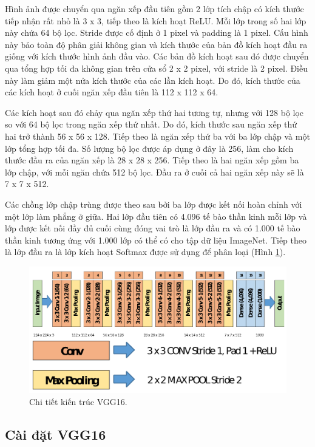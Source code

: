 Hình ảnh được chuyển qua ngăn xếp đầu tiên gồm 2 lớp tích chập có kích thước tiếp nhận rất nhỏ là 3 x 3, tiếp theo là kích hoạt ReLU. Mỗi lớp trong số hai lớp này chứa 64 bộ lọc. Stride được cố định ở 1 pixel và padding là 1 pixel. Cấu hình này bảo toàn độ phân giải không gian và kích thước của bản đồ kích hoạt đầu ra giống với kích thước hình ảnh đầu vào. Các bản đồ kích hoạt sau đó được chuyển qua tổng hợp tối đa không gian trên cửa sổ 2 x 2 pixel, với stride là 2 pixel. Điều này làm giảm một nửa kích thước của các lần kích hoạt. Do đó, kích thước của các kích hoạt ở cuối ngăn xếp đầu tiên là 112 x 112 x 64.

Các kích hoạt sau đó chảy qua ngăn xếp thứ hai tương tự, nhưng với 128 bộ lọc so với 64 bộ lọc trong ngăn xếp thứ nhất. Do đó, kích thước sau ngăn xếp thứ hai trở thành 56 x 56 x 128. Tiếp theo là ngăn xếp thứ ba với ba lớp chập và một lớp tổng hợp tối đa. Số lượng bộ lọc được áp dụng ở đây là 256, làm cho kích thước đầu ra của ngăn xếp là 28 x 28 x 256. Tiếp theo là hai ngăn xếp gồm ba lớp chập, với mỗi ngăn chứa 512 bộ lọc. Đầu ra ở cuối cả hai ngăn xếp này sẽ là 7 x 7 x 512.

Các chồng lớp chập trùng được theo sau bởi ba lớp được kết nối hoàn chỉnh với một lớp làm phẳng ở giữa. Hai lớp đầu tiên có 4.096 tế bào thần kinh mỗi lớp và lớp được kết nối đầy đủ cuối cùng đóng vai trò là lớp đầu ra và có 1.000 tế bào thần kinh tương ứng với 1.000 lớp có thể có cho tập dữ liệu ImageNet. Tiếp theo là lớp đầu ra là lớp kích hoạt Softmax được sử dụng để phân loại (Hình \ref{fig:vgg16_imagenet_detail}).

\begin{figure}[H]
	\centering
	\includegraphics[width=1\linewidth]{images/vgg16_imagenet_detail}
	\caption{Chi tiết kiến trúc VGG16.}
	\label{fig:vgg16_imagenet_detail}
\end{figure}

\subsection{Cài đặt VGG16}


